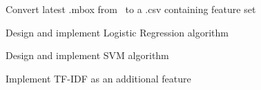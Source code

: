 \documentclass[10pt,twocolumn,letterpaper]{article}
\begin{document}
\begin{description}
\item Convert latest .mbox from~\cite{monkey} to a .csv containing feature set
\item Design and implement Logistic Regression algorithm
\item Design and implement SVM algorithm    
\item Implement TF-IDF as an additional feature
\end{description}


{\small


}
\end{document}
